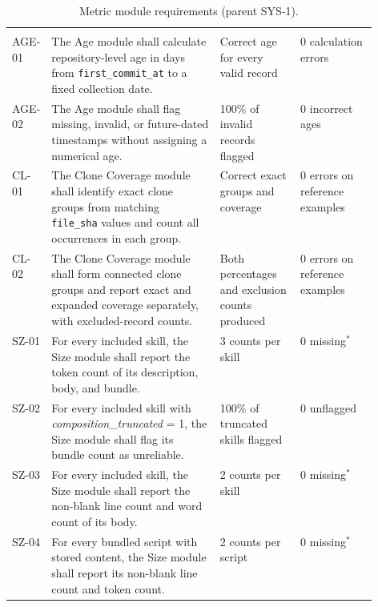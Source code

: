 \begin{singlespace}
\setlength{\LTcapwidth}{\linewidth}
\begin{longtable}{@{}L{0.10\linewidth} L{\tabcolsep\relax} L{0.22\linewidth} L{0.21\linewidth}@{}}
\caption{Metric module requirements (parent SYS-1).}\label{tab:age-clone-reqs}\\
 &  &  &  \\
\midrule
\endfirsthead
{}
 &  &  &  \\
\midrule
\endhead
\bottomrule
\endfoot
AGE-01 & The Age module shall calculate repository-level age in days from \texttt{first\_commit\_at} to a fixed collection date. & Correct age for every valid record & 0 calculation errors \\
\addlinespace[3pt]
AGE-02 & The Age module shall flag missing, invalid, or future-dated timestamps without assigning a numerical age. & 100\% of invalid records flagged & 0 incorrect ages \\
\addlinespace[3pt]
CL-01 & The Clone Coverage module shall identify exact clone groups from matching \texttt{file\_sha} values and count all occurrences in each group. & Correct exact groups and coverage & 0 errors on reference examples \\
\addlinespace[3pt]
CL-02 & The Clone Coverage module shall form connected clone groups and report exact and expanded coverage separately, with excluded-record counts. & Both percentages and exclusion counts produced & 0 errors on reference examples \\
\addlinespace[3pt]
SZ-01 & For every included skill, the Size module shall report the token count of its description, body, and bundle. & 3 counts per skill & 0 missing$^{*}$ \\
\addlinespace[3pt]
SZ-02 & For every included skill with \textit{composition\_truncated} = 1, the Size module shall flag its bundle count as unreliable. & 100\% of truncated skills flagged & 0 unflagged \\
\addlinespace[3pt]
SZ-03 & For every included skill, the Size module shall report the non-blank line count and word count of its body. & 2 counts per skill & 0 missing$^{*}$ \\
\addlinespace[3pt]
SZ-04 & For every bundled script with stored content, the Size module shall report its non-blank line count and token count. & 2 counts per script & 0 missing$^{*}$ \\

\end{longtable}
\end{singlespace}
